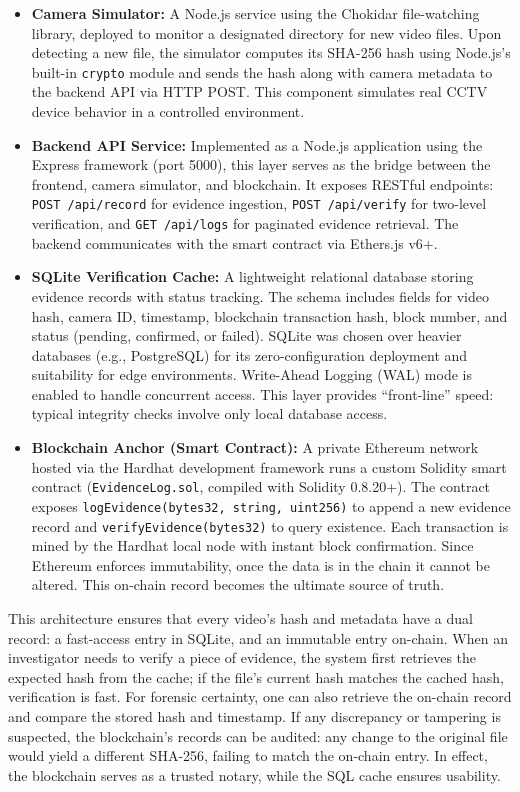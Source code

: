 \documentclass[conference]{IEEEtran}
\begin{document}
\begin{itemize}
    \item \textbf{Camera Simulator:} A Node.js service using the Chokidar file-watching library, deployed to monitor a designated directory for new video files. Upon detecting a new file, the simulator computes its SHA-256 hash using Node.js's built-in \texttt{crypto} module and sends the hash along with camera metadata to the backend API via HTTP POST. This component simulates real CCTV device behavior in a controlled environment.

    \item \textbf{Backend API Service:} Implemented as a Node.js application using the Express framework (port 5000), this layer serves as the bridge between the frontend, camera simulator, and blockchain. It exposes RESTful endpoints: \texttt{POST /api/record} for evidence ingestion, \texttt{POST /api/verify} for two-level verification, and \texttt{GET /api/logs} for paginated evidence retrieval. The backend communicates with the smart contract via Ethers.js v6+.

    \item \textbf{SQLite Verification Cache:} A lightweight relational database storing evidence records with status tracking. The schema includes fields for video hash, camera ID, timestamp, blockchain transaction hash, block number, and status (pending, confirmed, or failed). SQLite was chosen over heavier databases (e.g., PostgreSQL) for its zero-configuration deployment and suitability for edge environments. Write-Ahead Logging (WAL) mode is enabled to handle concurrent access. This layer provides ``front-line'' speed: typical integrity checks involve only local database access.

    \item \textbf{Blockchain Anchor (Smart Contract):} A private Ethereum network hosted via the Hardhat development framework runs a custom Solidity smart contract (\texttt{EvidenceLog.sol}, compiled with Solidity 0.8.20+). The contract exposes \texttt{logEvidence(bytes32, string, uint256)} to append a new evidence record and \texttt{verifyEvidence(bytes32)} to query existence. Each transaction is mined by the Hardhat local node with instant block confirmation. Since Ethereum enforces immutability, once the data is in the chain it cannot be altered. This on-chain record becomes the ultimate source of truth.
\end{itemize}

This architecture ensures that every video's hash and metadata have a dual record: a fast-access entry in SQLite, and an immutable entry on-chain. When an investigator needs to verify a piece of evidence, the system first retrieves the expected hash from the cache; if the file's current hash matches the cached hash, verification is fast. For forensic certainty, one can also retrieve the on-chain record and compare the stored hash and timestamp. If any discrepancy or tampering is suspected, the blockchain's records can be audited: any change to the original file would yield a different SHA-256, failing to match the on-chain entry. In effect, the blockchain serves as a trusted notary, while the SQL cache ensures usability.
\end{document}
